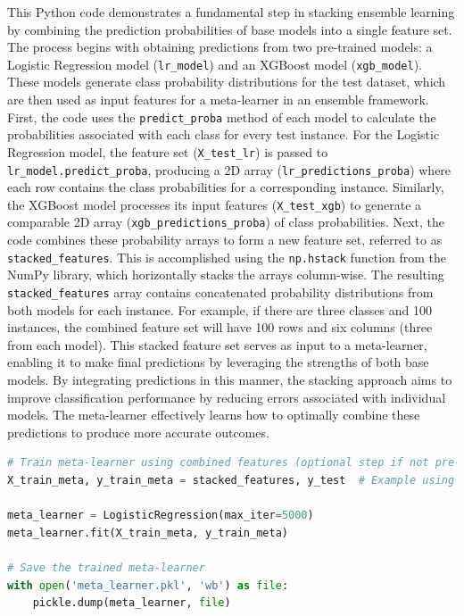\noindent
This Python code demonstrates a fundamental step in stacking ensemble learning by combining the prediction probabilities of base models into a single feature set. The process begins with obtaining predictions from two pre-trained models: a Logistic Regression model (\texttt{lr\_model}) and an XGBoost model (\texttt{xgb\_model}). These models generate class probability distributions for the test dataset, which are then used as input features for a meta-learner in an ensemble framework. First, the code uses the \texttt{predict\_proba} method of each model to calculate the probabilities associated with each class for every test instance. For the Logistic Regression model, the feature set (\texttt{X\_test\_lr}) is passed to \texttt{lr\_model.predict\_proba}, producing a 2D array (\texttt{lr\_predictions\_proba}) where each row contains the class probabilities for a corresponding instance. Similarly, the XGBoost model processes its input features (\texttt{X\_test\_xgb}) to generate a comparable 2D array (\texttt{xgb\_predictions\_proba}) of class probabilities. Next, the code combines these probability arrays to form a new feature set, referred to as \texttt{stacked\_features}. This is accomplished using the \texttt{np.hstack} function from the NumPy library, which horizontally stacks the arrays column-wise. The resulting \texttt{stacked\_features} array contains concatenated probability distributions from both models for each instance. For example, if there are three classes and 100 instances, the combined feature set will have 100 rows and six columns (three from each model). This stacked feature set serves as input to a meta-learner, enabling it to make final predictions by leveraging the strengths of both base models. By integrating predictions in this manner, the stacking approach aims to improve classification performance by reducing errors associated with individual models. The meta-learner effectively learns how to optimally combine these predictions to produce more accurate outcomes.
    
\begin{tcolorbox}[colback=gray!5!white, colframe=gray!80!black, boxrule=0.5pt, title=Ensemble Model 1 : Train Meta-Learner]
\begin{lstlisting}[language=Python]
# Train meta-learner using combined features (optional step if not pre-trained)
X_train_meta, y_train_meta = stacked_features, y_test  # Example using test data as meta-training data

meta_learner = LogisticRegression(max_iter=5000)
meta_learner.fit(X_train_meta, y_train_meta)

# Save the trained meta-learner
with open('meta_learner.pkl', 'wb') as file:
    pickle.dump(meta_learner, file)
\end{lstlisting}
\end{tcolorbox}

